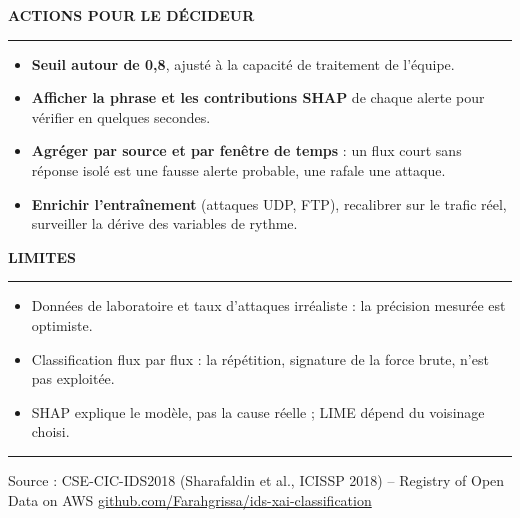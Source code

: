 \documentclass[10pt,a4paper]{article}
\newcommand{\github}{\href{https://github.com/Farahgrissa/ids-xai-classification}{github.com/Farahgrissa/ids-xai-classification}}
\newcommand{\rubrique}[1]{%
  \vspace{4pt}%
  {\color{orange}\bfseries\small\MakeUppercase{#1}}\par\vspace{-3pt}%
  {\color{trait}\rule{\linewidth}{0.5pt}}\par\vspace{1pt}}
\begin{document}
\begin{minipage}[t]{0.485\linewidth}
\rubrique{Actions pour le décideur}
\begin{conseil}
\begin{itemize}
  \item \textbf{Seuil autour de 0,8}, ajusté à la capacité de traitement de l'équipe.
  \item \textbf{Afficher la phrase et les contributions SHAP} de chaque alerte pour vérifier en quelques secondes.
  \item \textbf{Agréger par source et par fenêtre de temps} : un flux court sans réponse isolé est une fausse
        alerte probable, une rafale une attaque.
  \item \textbf{Enrichir l'entraînement} (attaques UDP, FTP), recalibrer sur le trafic réel, surveiller la dérive
        des variables de rythme.
\end{itemize}
\end{conseil}

\rubrique{Limites}
\begin{itemize}
  \item Données de laboratoire et taux d'attaques irréaliste : la précision mesurée est optimiste.
  \item Classification flux par flux : la répétition, signature de la force brute, n'est pas exploitée.
  \item SHAP explique le modèle, pas la cause réelle ; LIME dépend du voisinage choisi.
\end{itemize}

\end{minipage}

\vfill
{\color{trait}\rule{\linewidth}{0.5pt}}\par
{\color{gris}\scriptsize Source : CSE-CIC-IDS2018 (Sharafaldin et al., ICISSP 2018) -- Registry of Open Data on AWS
\hfill \github}
\end{document}
